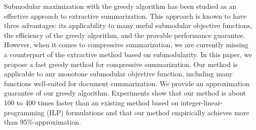 Submodular maximization with the greedy algorithm has been studied as an effective approach to extractive summarization. This approach is known to have three advantages: its applicability to many useful submodular objective functions, the efficiency of the greedy algorithm, and the provable performance guarantee. However, when it comes to compressive summarization, we are currently missing a counterpart of the extractive method based on submodularity. In this paper, we propose a fast greedy method for compressive summarization. Our method is applicable to any monotone submodular objective function, including many functions well-suited for document summarization. We provide an approximation guarantee of our greedy algorithm. Experiments show that our method is about 100 to 400 times faster than an existing method based on integer-linear-programming (ILP) formulations and that our method empirically achieves more than 95\%-approximation.
